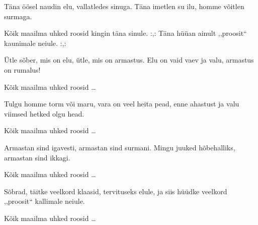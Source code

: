 T\"ana \"o\"osel naudin elu,
vallatledes sinuga.
T\"ana imetlen su ilu,
homme v\~oitlen surmaga.

K\~oik maailma uhked roosid
kingin t\"ana sinule.
:,: T\"ana h\"u\"uan ainult ,,proosit{``}
kaunimale neiule. :,: 

\"Utle s\~ober, mis on elu,
\"utle, mis on armastus.
Elu on vaid vaev ja valu,
armastus on rumalus!

K\~oik maailma uhked roosid \ldots

Tulgu homme torm v\~oi maru,
vara on veel heita pead,
enne ahastust ja valu
viimsed hetked olgu head.

K\~oik maailma uhked roosid \ldots

Armastan sind igavesti,
armastan sind surmani.
Mingu juuked h\~obehalliks,
armastan sind ikkagi.

K\~oik maailma uhked roosid \ldots

S\~obrad, t\"aitke veelkord klaasid,
tervituseks elule,
ja siis h\"u\"udke veelkord ,,proosit{``}
kallimale neiule.

K\~oik maailma uhked roosid \ldots